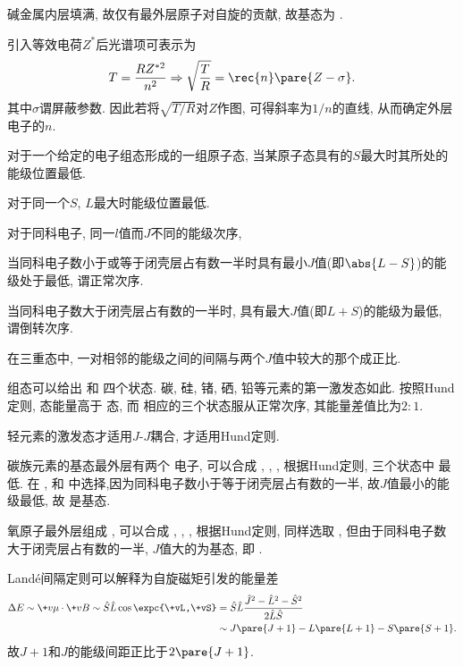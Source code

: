 \documentclass[hidelinks]{ctexart}
\begin{document}
\begin{ex}
    碱金属内层填满, 故仅有最外层原子对自旋的贡献, 故基态为 .
\end{ex}
引入等效电荷$Z^*$后光谱项可表示为
\[ T = \frac{RZ^{*2}}{n^2} \Rightarrow \sqrt{\frac{T}{R}} = \rec{n}\pare{Z-\sigma}. \]
其中$\sigma$谓屏蔽参数. 因此若将$\sqrt{T/R}$对$Z$作图, 可得斜率为$1/n$的直线, 从而确定外层电子的$n$.
\begin{resume}
    \begin{theorem}[Hund规则]
    \begin{cenum}
        \item 对于一个给定的电子组态形成的一组原子态, 当某原子态具有的$S$最大时其所处的能级位置最低.
        \item 对于同一个$S$, $L$最大时能级位置最低.
        \item 对于同科电子, 同一$l$值而$J$不同的能级次序,
        \begin{cenum}
            \item 当同科电子数小于或等于闭壳层占有数一半时具有最小$J$值(即$\abs{L-S}$)的能级处于最低, 谓正常次序.
            \item 当同科电子数大于闭壳层占有数的一半时, 具有最大$J$值(即$L+S$)的能级为最低, 谓倒转次序.
        \end{cenum}
    \end{cenum}
    \end{theorem}
    \begin{theorem}
        在三重态中, 一对相邻的能级之间的间隔与两个$J$值中较大的那个成正比.
    \end{theorem}
\end{resume}
\begin{ex}
    组态可以给出 和 四个状态. 碳, 硅, 锗, 硒, 铅等元素的第一激发态如此. 按照Hund定则, 态能量高于 态, 而 相应的三个状态服从正常次序, 其能量差值比为$2:1$.
\end{ex}
\begin{remark}
    轻元素的激发态才适用$J$-$J$耦合, 才适用Hund定则.
\end{remark}
\begin{ex}
    碳族元素的基态最外层有两个 电子, 可以合成 , , , 根据Hund定则, 三个状态中 最低. 在 , 和 中选择,因为同科电子数小于等于闭壳层占有数的一半, 故$J$值最小的能级最低, 故 是基态.
\end{ex}
\begin{ex}
    氧原子最外层组成 , 可以合成 , , , 根据Hund定则, 同样选取 , 但由于同科电子数大于闭壳层占有数的一半, $J$值大的为基态, 即 .
\end{ex}
Land\'e间隔定则可以解释为自旋磁矩引发的能量差
\begin{align*}
    \Delta E \sim \+v\mu \cdot \+vB \sim \hat S\hat L \cos\expc{\+vL,\+vS} &= \hat S \hat L \frac{\hat J^2 - \hat L^2 - \hat S^2}{2\hat L \hat S}\\ &\sim J\pare{J+1} - L\pare{L+1} - S\pare{S+1}.
\end{align*}
故$J+1$和$J$的能级间距正比于$2\pare{J+1}$.
\end{document}
